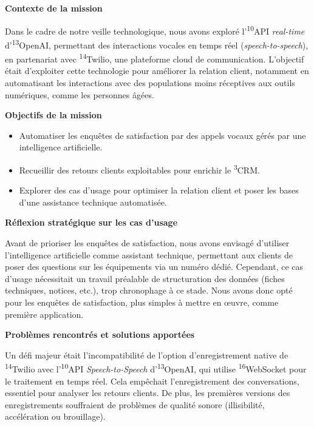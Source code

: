 \textbf{Contexte de la mission}\vspace{0.3cm}

Dans le cadre de notre veille technologique, nous avons exploré l’\textsuperscript{10}API \textit{real-time} d’\textsuperscript{13}OpenAI, permettant des interactions vocales en temps réel (\textit{speech-to-speech}), en partenariat avec \textsuperscript{14}Twilio, une plateforme cloud de communication. L’objectif était d’exploiter cette technologie pour améliorer la relation client, notamment en automatisant les interactions avec des populations moins réceptives aux outils numériques, comme les personnes âgées.\vspace{0.3cm}

\textbf{Objectifs de la mission}\vspace{0.3cm}

\begin{itemize}
    \item Automatiser les enquêtes de satisfaction par des appels vocaux gérés par une intelligence artificielle.\vspace{0.3cm}
    \item Recueillir des retours clients exploitables pour enrichir le \textsuperscript{3}CRM.\vspace{0.3cm}
    \item Explorer des cas d’usage pour optimiser la relation client et poser les bases d’une assistance technique automatisée.\vspace{0.3cm}
\end{itemize}

\textbf{Réflexion stratégique sur les cas d’usage}\vspace{0.3cm}

Avant de prioriser les enquêtes de satisfaction, nous avons envisagé d’utiliser l’intelligence artificielle comme assistant technique, permettant aux clients de poser des questions sur les équipements via un numéro dédié. Cependant, ce cas d’usage nécessitait un travail préalable de structuration des données (fiches techniques, notices, etc.), trop chronophage à ce stade. Nous avons donc opté pour les enquêtes de satisfaction, plus simples à mettre en œuvre, comme première application.\vspace{0.3cm}

\textbf{Problèmes rencontrés et solutions apportées}\vspace{0.3cm}

Un défi majeur était l’incompatibilité de l’option d’enregistrement native de \textsuperscript{14}Twilio avec l’\textsuperscript{10}API \textit{Speech-to-Speech} d’\textsuperscript{13}OpenAI, qui utilise \textsuperscript{16}WebSocket pour le traitement en temps réel. Cela empêchait l’enregistrement des conversations, essentiel pour analyser les retours clients. De plus, les premières versions des enregistrements souffraient de problèmes de qualité sonore (illisibilité, accélération ou brouillage).\vspace{0.3cm}

